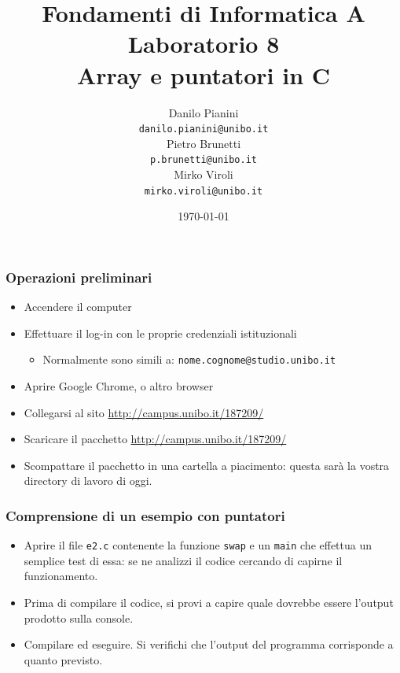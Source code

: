 \documentclass{beamer}
\begin{document}
\title[Lab1 - FV]{Fondamenti di Informatica A \\ Laboratorio 8 \\ Array e puntatori in C}
\author[Danilo Pianini]{Danilo Pianini\\\texttt{danilo.pianini@unibo.it} \\ \vspace{3pt} Pietro Brunetti\\\texttt{p.brunetti@unibo.it} \\ \vspace{3pt} Mirko Viroli\\\texttt{mirko.viroli@unibo.it} }
\date[\today]{\today}

\frame{\titlepage} 

\begin{frame}
\frametitle{Operazioni preliminari}
\begin{itemize}
 \item Accendere il computer
 \item Effettuare il log-in con le proprie credenziali istituzionali
  \begin{itemize}
    \item Normalmente sono simili a: \texttt{nome.cognome@studio.unibo.it}
  \end{itemize}
 \item Aprire Google Chrome, o altro browser
 \item Collegarsi al sito \url{http://campus.unibo.it/187209/}
 \item Scaricare il pacchetto \url{http://campus.unibo.it/187209/}
 \item Scompattare il pacchetto in una cartella a piacimento: questa sarà la vostra directory di lavoro di oggi.
\end{itemize}
\end{frame}

\begin{frame}
\frametitle{Comprensione di un esempio con puntatori}
\begin{itemize}
 \item Aprire il file \texttt{e2.c} contenente la funzione \texttt{swap} e un \texttt{main} che effettua un semplice test di essa: se ne analizzi il codice cercando di capirne il funzionamento.
 \item Prima di compilare il codice, si provi a capire quale dovrebbe essere l'output prodotto sulla console.
 \item Compilare ed eseguire. Si verifichi che l'output del programma corrisponde a quanto previsto.
\end{itemize}
\end{frame}
\end{document}
